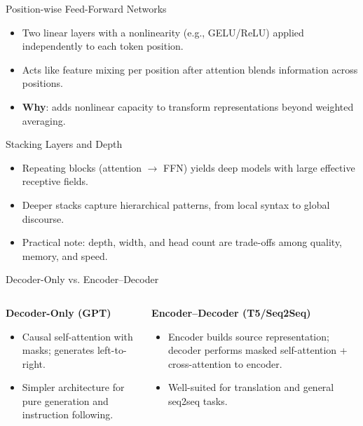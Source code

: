 \documentclass[aspectratio=169]{beamer}
\begin{document}
\begin{frame}{Position-wise Feed-Forward Networks}
  \begin{itemize}
    \item Two linear layers with a nonlinearity (e.g., GELU/ReLU) applied independently to each token position.
    \item Acts like feature mixing per position after attention blends information across positions.
    \item \textbf{Why}: adds nonlinear capacity to transform representations beyond weighted averaging.
  \end{itemize}
\end{frame}

\begin{frame}{Stacking Layers and Depth}
  \begin{itemize}
    \item Repeating blocks (attention $\rightarrow$ FFN) yields deep models with large effective receptive fields.
    \item Deeper stacks capture hierarchical patterns, from local syntax to global discourse.
    \item Practical note: depth, width, and head count are trade-offs among quality, memory, and speed.
  \end{itemize}
\end{frame}

\begin{frame}{Decoder-Only vs. Encoder--Decoder}
  \begin{columns}[T,onlytextwidth]
    \begin{column}{0.48\linewidth}
      \textbf{Decoder-Only (GPT)}
      \begin{itemize}
        \item Causal self-attention with masks; generates left-to-right.
        \item Simpler architecture for pure generation and instruction following.
      \end{itemize}
    \end{column}
    \begin{column}{0.48\linewidth}
      \textbf{Encoder--Decoder (T5/Seq2Seq)}
      \begin{itemize}
        \item Encoder builds source representation; decoder performs masked self-attention + cross-attention to encoder.
        \item Well-suited for translation and general seq2seq tasks.
      \end{itemize}
    \end{column}
  \end{columns}
\end{frame}
\end{document}
